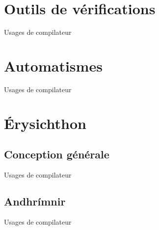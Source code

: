 \documentclass{backend/backend}
\begin{document}
\section{Outils de vérifications}
\begin{frame}{Usages de compilateur}
    
\end{frame}
\section{Automatismes}
\begin{frame}{Usages de compilateur}
    
\end{frame}
\section{Érysichthon}

\subsection{Conception générale}
\begin{frame}{Usages de compilateur}
    
\end{frame}
\subsection{Andhrímnir}
\begin{frame}{Usages de compilateur}
    
\end{frame}
\end{document}
